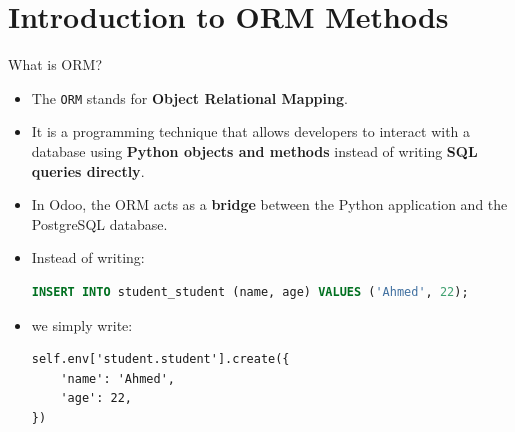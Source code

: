 \section{Introduction to ORM Methods}

\begin{frame}[fragile]{What is ORM?}
	\begin{itemize}
		\item The \texttt{ORM} stands for \textbf{Object Relational Mapping}.
		\item It is a programming technique that allows developers to interact with a database using \textbf{Python objects and methods} instead of writing \textbf{SQL queries directly}.
		\item In Odoo, the ORM acts as a \textbf{bridge} between the Python application and the PostgreSQL database.
		\item Instead of writing:
		\begin{lstlisting}[language=SQL,basicstyle=\scriptsize]
INSERT INTO student_student (name, age) VALUES ('Ahmed', 22);
\end{lstlisting}
		\item we simply write:
		\begin{lstlisting}
self.env['student.student'].create({
	'name': 'Ahmed',
	'age': 22,
})
\end{lstlisting}
	\end{itemize}
\end{frame}

